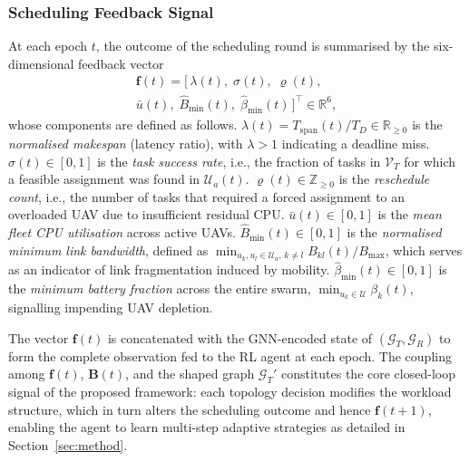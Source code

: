\subsubsection*{Scheduling Feedback Signal}

At each epoch $t$, the outcome of the scheduling round is summarised
by the six-dimensional feedback vector
\begin{equation}
  \begin{split}
    \mathbf{f}(t) = \bigl[\,
      \lambda(t),\; \sigma(t),\; \varrho(t),\\
      \bar{u}(t),\; \hat{B}_{\min}(t),\; \hat{\beta}_{\min}(t)\,
    \bigr]^{\!\top} \in \mathbb{R}^6,
  \end{split}
  \label{eq:feedback}
\end{equation}
whose components are defined as follows.
$\lambda(t) = T_{\mathrm{span}}(t)/T_D \in \mathbb{R}_{\geq 0}$ is
the \emph{normalised makespan} (latency ratio), with $\lambda > 1$
indicating a deadline miss.
$\sigma(t) \in [0, 1]$ is the \emph{task success rate}, i.e., the
fraction of tasks in $\mathcal{V}_T$ for which a feasible assignment
was found in $\mathcal{U}_a(t)$.
$\varrho(t) \in \mathbb{Z}_{\geq 0}$ is the \emph{reschedule count},
i.e., the number of tasks that required a forced assignment to an
overloaded UAV due to insufficient residual CPU.
$\bar{u}(t) \in [0, 1]$ is the \emph{mean fleet CPU utilisation}
across active UAVs.
$\hat{B}_{\min}(t) \in [0, 1]$ is the \emph{normalised minimum link
bandwidth}, defined as
$\min_{u_k, u_l \in \mathcal{U}_a,\, k \neq l} B_{kl}(t) / B_{\max}$,
which serves as an indicator of link fragmentation induced by mobility.
$\hat{\beta}_{\min}(t) \in [0, 1]$ is the \emph{minimum battery
fraction} across the entire swarm,
$\min_{u_k \in \mathcal{U}} \beta_k(t)$, signalling impending UAV
depletion.

The vector $\mathbf{f}(t)$ is concatenated with the GNN-encoded
state of $(\mathcal{G}_T, \mathcal{G}_R)$ to form the complete
observation fed to the RL agent at each epoch.
The coupling among $\mathbf{f}(t)$, $\mathbf{B}(t)$, and the shaped
graph $\mathcal{G}_T'$ constitutes the core closed-loop signal of the
proposed framework: each topology decision modifies the workload
structure, which in turn alters the scheduling outcome and hence
$\mathbf{f}(t+1)$, enabling the agent to learn multi-step adaptive
strategies as detailed in Section~\ref{sec:method}.
